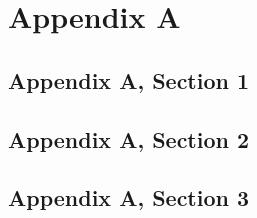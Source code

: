 \documentclass[a4paper,11pt,oneside]{memoir}
\numberwithin{algorithm}{chapter}
\begin{document}
%
%   
\setcounter{secnumdepth}{2}












\appendix
\chapter{Appendix A}
\lipsum[1]
\section{Appendix A, Section 1}
\lipsum[2-3]
\section{Appendix A, Section 2}
\lipsum[4-5]
\section{Appendix A, Section 3}
\lipsum[6-7]
\end{document}
